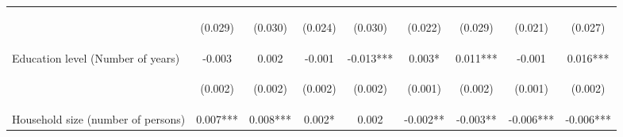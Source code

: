 \begin{center}
\begin{tabular}{lcccccccc}
\vspace{4pt} & \begin{footnotesize}(0.029)\end{footnotesize} & \begin{footnotesize}(0.030)\end{footnotesize} & \begin{footnotesize}(0.024)\end{footnotesize} & \begin{footnotesize}(0.030)\end{footnotesize} & \begin{footnotesize}(0.022)\end{footnotesize} & \begin{footnotesize}(0.029)\end{footnotesize} & \begin{footnotesize}(0.021)\end{footnotesize} & \begin{footnotesize}(0.027)\end{footnotesize} \\
Education level (Number of years) & -0.003 & 0.002 & -0.001 & -0.013*** & 0.003* & 0.011*** & -0.001 & 0.016*** \\
\vspace{4pt} & \begin{footnotesize}(0.002)\end{footnotesize} & \begin{footnotesize}(0.002)\end{footnotesize} & \begin{footnotesize}(0.002)\end{footnotesize} & \begin{footnotesize}(0.002)\end{footnotesize} & \begin{footnotesize}(0.001)\end{footnotesize} & \begin{footnotesize}(0.002)\end{footnotesize} & \begin{footnotesize}(0.001)\end{footnotesize} & \begin{footnotesize}(0.002)\end{footnotesize} \\
Household size (number of persons) & 0.007*** & 0.008*** & 0.002* & 0.002 & -0.002** & -0.003** & -0.006*** & -0.006*** \\

\end{tabular}
\end{center}
